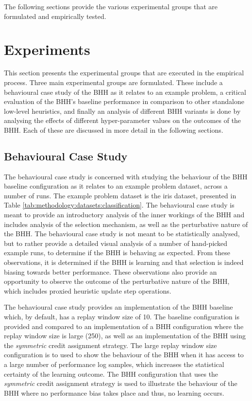 The following sections provide the various experimental groups that are formulated and empirically tested.


\section{Experiments}
\label{sec:methodology:experiments}

This section presents the experimental groups that are executed in the empirical process. Three main experimental groups are formulated. These include a behavioural case study of the \acs{BHH} as it relates to an example problem, a critical evaluation of the \acs{BHH}'s baseline performance in comparison to other standalone low-level heuristics, and finally an analysis of different \acs{BHH} variants is done by analysing the effects of different hyper-parameter values on the outcomes of the \acs{BHH}. Each of these are discussed in more detail in the following sections.


\subsection{Behavioural Case Study}
\label{sec:methodology:experiments:case_study}

The behavioural case study is concerned with studying the behaviour of the \acs{BHH} baseline configuration as it relates to an example problem dataset, across a number of runs. The example problem dataset is the iris dataset, presented in Table \ref{tab:methodology:datasets:classification}. The behavioural case study is meant to provide an introductory analysis of the inner workings of the \acs{BHH} and includes analysis of the selection mechanism, as well as the perturbative nature of the \acs{BHH}. The behavioural case study is not meant to be statistically analysed, but to rather provide a detailed visual analysis of a number of hand-picked example runs, to determine if the \acs{BHH} is behaving as expected. From these observations, it is determined if the \acs{BHH} is learning and that selection is indeed biasing towards better performance. These observations also provide an opportunity to observe the outcome of the perturbative nature of the \acs{BHH}, which includes proxied heuristic update step operations.

The behavioural case study provides an implementation of the \acs{BHH} baseline which, by default, has a replay window size of 10. The baseline configuration is provided and compared to an implementation of a \acs{BHH} configuration where the replay window size is large (250), as well as an implementation of the \acs{BHH} using the \textit{symmetric} credit assignment strategy. The large replay window size configuration is to used to show the behaviour of the \acs{BHH} when it has access to a large number of performance log samples, which increases the statistical certainty of the learning outcome. The \acs{BHH} configuration that uses the \textit{symmetric} credit assignment strategy is used to illustrate the behaviour of the \acs{BHH} where no performance bias takes place and thus, no learning occurs.

